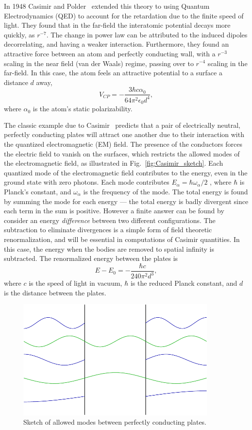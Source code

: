 In 1948 Casimir and Polder~\cite{CasimirPolder1948} extended this theory to using Quantum Electrodynamics
(QED) to account for the retardation due to the finite speed of light.  They found that in the 
far-field the interatomic potential decays more quickly, as $r^{-7}$.  The change in power law can be 
attributed to the induced dipoles decorrelating, and having a weaker interaction.  Furthermore,
they found an attractive force between an atom and perfectly conducting wall, with a $r^{-3}$ scaling
in the near field (van der Waals) regime, passing over to $r^{-4}$ scaling in the far-field.    
In this case, the atom feels an attractive potential to a surface a distance $d$ away,
\begin{equation}
  V_{CP} =-\frac{3\hbar c\alpha_0}{64\pi^2\epsilon_0 d^4},
\end{equation}
where $\alpha_0$ is the atom's static polarizability.  

The classic example due to Casimir~\cite{Casimir1948} predicts that a pair of electrically neutral,
perfectly conducting plates will attract one another due to their interaction with the quantized 
electromagnetic (EM) field.  
The presence of the conductors forces the electric field to vanish on the surfaces,
which restricts the allowed modes of the electromagnetic field, as illustrated in Fig.~\ref{fig:Casimir_sketch}.
Each quantized mode of the electromagnetic field contributes
to the energy, even in the ground state with zero photons.  Each mode contributes 
$E_\alpha=\hbar\omega_\alpha/2$ , where $\hbar$ is Planck's  constant, and $\omega_\alpha$ is the frequency of the mode.
The total energy is found by summing the mode for each energy --- the total energy is
badly divergent since each term in the sum is positive.  However a finite answer can 
be found by consider an energy \emph{difference} between two different configurations.  
The subtraction to eliminate divergences is a simple form of field theoretic renormalization, 
and will be essential in computations of Casimir quantities.  
In this case, the energy when the bodies are removed to spatial infinity is subtracted.  
The renormalized energy between the plates is
\begin{equation}
  E-E_0 = -\frac{\hbar c}{240\pi^2 d^3},
\end{equation}
where $c$ is the speed of light in vacuum, $\hbar$ is the reduced Planck constant,
and $d$ is the distance between the plates.  
\begin{figure}
\center
\includegraphics[width=10cm]{fig/intro/twoplanes_wave}
\caption{Sketch of allowed modes between perfectly conducting plates.}
\label{fig:Casimir_plates}
\end{figure}

